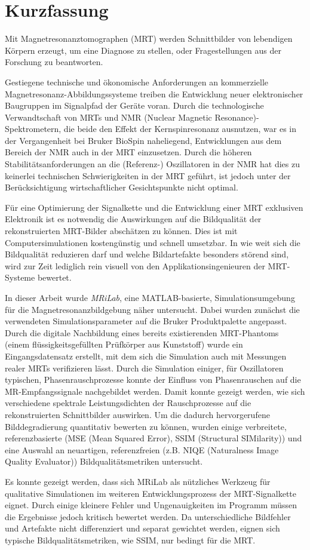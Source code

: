 \chapter*{Kurzfassung}
\thispagestyle{empty}
Mit Magnetresonanztomographen (MRT) werden Schnittbilder von lebendigen Körpern erzeugt, um eine Diagnose zu stellen, oder Fragestellungen aus der Forschung zu beantworten.

Gestiegene technische und ökonomische Anforderungen an kommerzielle Magnetresonanz-Abbildungssysteme treiben die Entwicklung neuer elektronischer Baugruppen im Signalpfad der Geräte voran. Durch die technologische Verwandtschaft von MRTs und NMR (Nuclear Magnetic Resonance)-Spektrometern, die beide den Effekt der Kernspinresonanz ausnutzen, war es in der Vergangenheit bei Bruker BioSpin naheliegend, Entwicklungen aus dem Bereich der NMR auch in der MRT einzusetzen. Durch die höheren Stabilitätsanforderungen an die (Referenz-) Oszillatoren in der NMR hat dies zu keinerlei technischen Schwierigkeiten in der MRT geführt, ist jedoch unter der Berücksichtigung wirtschaftlicher Gesichtspunkte nicht optimal.

Für eine Optimierung der Signalkette und die Entwicklung einer MRT exklusiven Elektronik ist es notwendig die Auswirkungen auf die Bildqualität der rekonstruierten MRT-Bilder abschätzen zu können. Dies ist mit Computersimulationen kostengünstig und schnell umsetzbar. In wie weit sich die Bildqualität reduzieren darf und welche Bildartefakte besonders störend sind, wird zur Zeit lediglich rein visuell von den Applikationsingenieuren der MRT-Systeme bewertet.

In dieser Arbeit wurde \textit{MRiLab}, eine MATLAB-basierte, Simulationsumgebung für die Magnetresonanzbildgebung näher untersucht. Dabei wurden zunächst die verwendeten Simulationsparameter auf die Bruker Produktpalette angepasst. Durch die digitale Nachbildung eines bereits existierenden MRT-Phantoms (einem flüssigkeitsgefüllten Prüfkörper aus Kunststoff) wurde ein Eingangsdatensatz erstellt, mit dem sich die Simulation auch mit Messungen realer MRTs verifizieren lässt. Durch die Simulation einiger, für Oszillatoren typischen, Phasenrauschprozesse konnte der Einfluss von Phasenrauschen auf die MR-Empfangssignale nachgebildet werden. Damit konnte gezeigt werden, wie sich verschiedene spektrale Leistungsdichten der Rauschprozesse auf die rekonstruierten Schnittbilder auswirken.
Um die dadurch hervorgerufene Bilddegradierung quantitativ bewerten zu können, wurden einige verbreitete, referenzbasierte (MSE (Mean Squared Error), SSIM (Structural SIMilarity)) und eine Auswahl an neuartigen, referenzfreien (z.B. NIQE (Naturalness Image Quality Evaluator)) Bildqualitätsmetriken untersucht.

Es konnte gezeigt werden, dass sich MRiLab als nützliches Werkzeug für qualitative Simulationen im weiteren Entwicklungsprozess der MRT-Signalkette eignet. Durch einige kleinere Fehler und Ungenauigkeiten im Programm müssen die Ergebnisse jedoch kritisch bewertet werden. Da unterschiedliche Bildfehler und Artefakte nicht differenziert und separat gewichtet werden, eignen sich typische Bildqualitätsmetriken, wie SSIM, nur bedingt für die MRT.


